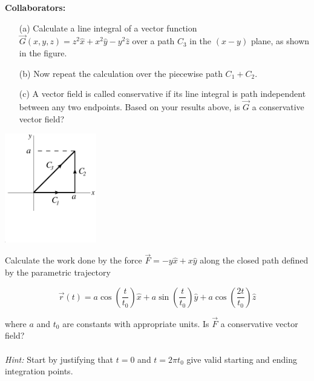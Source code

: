 \documentclass[11pt,letterpaper,boxed]{hmcpset}
\begin{document}
	
	\noindent\textbf{Collaborators:} 
	
	
	\begin{problem}[Problem 1]
		
		\begin{enumerate}
			\item [(a)] Calculate a line integral of a vector function
			$\vec{G}(x,y,z) = z^2 \hat x + x^2 \hat y - y^2 \hat z$ over a path $C_3$ in the $(x-y)$ plane, as shown in the figure.
			\item [(b)] Now repeat the calculation over the piecewise path $C_1+C_2$.
			\item [(c)] A vector field is called conservative if its line
			integral is path independent between any two endpoints.  Based on your results above, is $\vec{G}$ a conservative vector field?
		\end{enumerate}
	
		\begin{center}
			\includegraphics[width=4cm]{hw5-fig}
		\end{center}
		
		
	\end{problem}
	
	\begin{solution}
		\vfill
	\end{solution}
	\newpage
	
	
	\begin{problem}[Problem 2]
		Calculate the work done by the force $\vec F = -y
		\hat x + x \hat y$ along the closed path defined by the parametric trajectory 
		
		\[\vec r (t) = a \cos{\left(\frac{t}{t_0}\right)} \hat x + a
		\sin{\left(\frac{t}{t_0}\right)} \hat y + a \cos{\left(\frac{2 t}{t_0}\right)} \hat z\] 
		
		where $a$ and $t_0$ are constants with appropriate units.   Is $\vec{F}$ a conservative vector field?  
		\\
		\\{\em Hint:} Start by justifying that $t=0$ and $t=2 \pi t_0$ give valid starting and ending integration points.  		
		
	\end{problem}
	
\end{document}
